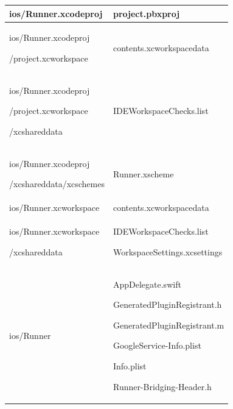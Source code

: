 \documentclass[conference]{IEEEtran}
\begin{document}
\begin{table}[h]
\begin{tabular}{|p{3.7cm}|p{4.1cm}|}
          ios/Runner.xcodeproj \par   & \par project.pbxproj
          \\ \hline

          ios/Runner.xcodeproj \par /project.xcworkspace   & \par contents.xcworkspacedata
          \\ \hline

          ios/Runner.xcodeproj \par /project.xcworkspace \par /xcshareddata  & \par IDEWorkspaceChecks.list
          \\ \hline

          ios/Runner.xcodeproj \par /xcshareddata/xcschemes  & \par Runner.xscheme
          \\ \hline

          ios/Runner.xcworkspace \par   & \par contents.xcworkspacedata
          \\ \hline

          ios/Runner.xcworkspace \par /xcshareddata  & \par IDEWorkspaceChecks.list \par WorkspaceSettings.xcsettings
          \\ \hline

          ios/Runner \par   & \par AppDelegate.swift \par GeneratedPluginRegistrant.h \par GeneratedPluginRegistrant.m \par GoogleService-Info.plist \par Info.plist \par Runner-Bridging-Header.h
          \\ \hline


\end{tabular}
\end{table}
\end{document}
